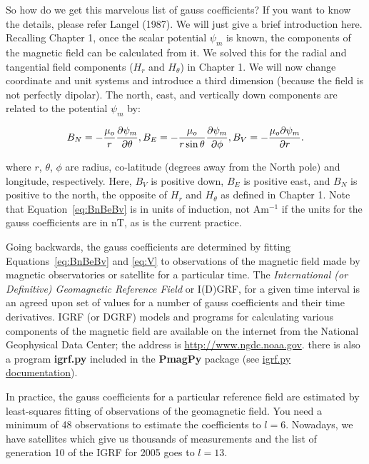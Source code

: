 So how do we get this marvelous list of gauss coefficients?  If you want to know the details, please refer Langel (1987). \nocite{langel87}  We will just give a brief introduction here.  
Recalling Chapter 1, once the scalar potential $\psi_m$ is known, 
the components of the magnetic field can
be calculated from it.  We solved this for the radial and tangential field components ($H_r$ and $H_{\theta}$)  in Chapter 1.   We will now change 
%
coordinate  and unit systems  and introduce a third dimension (because the field is not  perfectly dipolar).   The north, east, and vertically down components are related to the potential  $\psi_m$ by:

\begin{equation} 
B_N=-{\mu_o\over r}  {{\partial \psi_m} \over { \partial  \theta}},
 B_E=-{\mu_o\over {r \sin \theta }} {{\partial \psi_m} \over {\partial \phi}},
 B_V=-{\mu_o{\partial \psi_m} \over{ \partial r}}.
\label{eq:BnBeBv}
 \end{equation}


\noindent where $r$, $\theta$, $\phi$ are radius, co-latitude (degrees
away from the North pole) and longitude,
respectively. Here, $B_V$ is positive down, $B_E$ is positive east, and  $B_N$ is positive to the north, the opposite of
$H_r$ and $H_{\theta}$ as defined in Chapter 1. Note that
Equation~\ref{eq:BnBeBv} is in units of induction, not Am$^{-1}$ if the units for the gauss coefficients are in  nT, as is the current practice.     

Going backwards, 
the gauss coefficients  are determined by fitting 
Equations~\ref{eq:BnBeBv}
 and \ref{eq:V} to observations
of the magnetic field made by magnetic observatories or satellite for a particular time.
The {\it International (or Definitive) Geomagnetic Reference
Field}  or  I(D)GRF,  for a given time interval is an agreed upon set of values for a
number of gauss coefficients and their time derivatives.  
%
%
IGRF (or DGRF) models and programs
for calculating various components of the magnetic field
are available on the internet from the 
National Geophysical Data Center; the address is \url{http://www.ngdc.noaa.gov}.  there is also a program {\bf igrf.py} included in the {\bf PmagPy} package (see \href{http://earthref.org/PmagPy/cookbook/#igrf.py}{igrf.py documentation}).   

In practice, the   gauss
coefficients for a particular reference field are estimated by least-squares fitting of  observations of the geomagnetic field.  You need a minimum of  48
observations to estimate the coefficients to $l=6$.  Nowadays, we have satellites which give us  thousands of measurements and the list of generation 10 of the IGRF for 2005 goes to $l=13$.  



